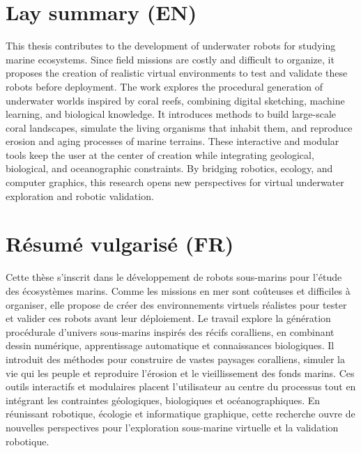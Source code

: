 \fontsize{13pt}{15pt}\selectfont

\section*{Lay summary (EN)}
This thesis contributes to the development of underwater robots for studying marine ecosystems. Since field missions are costly and difficult to organize, it proposes the creation of realistic virtual environments to test and validate these robots before deployment. The work explores the procedural generation of underwater worlds inspired by coral reefs, combining digital sketching, machine learning, and biological knowledge. It introduces methods to build large-scale coral landscapes, simulate the living organisms that inhabit them, and reproduce erosion and aging processes of marine terrains. These interactive and modular tools keep the user at the center of creation while integrating geological, biological, and oceanographic constraints. By bridging robotics, ecology, and computer graphics, this research opens new perspectives for virtual underwater exploration and robotic validation.



\section*{Résumé vulgarisé (FR)}
Cette thèse s'inscrit dans le développement de robots sous-marins pour l'étude des écosystèmes marins. Comme les missions en mer sont coûteuses et difficiles à organiser, elle propose de créer des environnements virtuels réalistes pour tester et valider ces robots avant leur déploiement. Le travail explore la génération procédurale d'univers sous-marins inspirés des récifs coralliens, en combinant dessin numérique, apprentissage automatique et connaissances biologiques. Il introduit des méthodes pour construire de vastes paysages coralliens, simuler la vie qui les peuple et reproduire l'érosion et le vieillissement des fonds marins. Ces outils interactifs et modulaires placent l'utilisateur au centre du processus tout en intégrant les contraintes géologiques, biologiques et océanographiques. En réunissant robotique, écologie et informatique graphique, cette recherche ouvre de nouvelles perspectives pour l'exploration sous-marine virtuelle et la validation robotique.